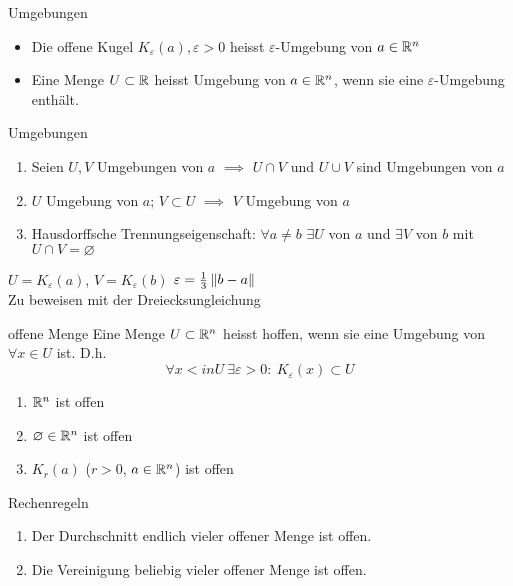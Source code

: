 \begin{Def}{Umgebungen}
  \begin{itemize}
    \item Die offene Kugel $K_\varepsilon(a), \varepsilon>0$ heisst $\varepsilon$-Umgebung von $a\in\mathbb{R}^n$
    \item Eine Menge $U\subset\mathbb{R}$ heisst Umgebung von $a\in\mathbb{R}^n$, wenn sie eine $\varepsilon$-Umgebung enthält.
  \end{itemize}
\end{Def}
\begin{Eig}{Umgebungen}
  \begin{enumerate}
    \item Seien $U,V$ Umgebungen von $a$ $\implies$ $U\cap V$ und $U\cup V$ sind Umgebungen von $a$
    \item $U$ Umgebung von $a$; $V \subset U$ $\implies$ $V$ Umgebung von $a$
    \item Hausdorffsche Trennungseigenschaft: $\forall a\neq b$ $\exists U$ von $a$ und $\exists V$ von $b$ mit $U\cap V=\varnothing$
  \end{enumerate}
\end{Eig}
\begin{Bsp}
  $U=K_\varepsilon(a)$, $V=K_\varepsilon(b)$ $\varepsilon=\frac{1}{3}\left\| b-a \right\|$\\
  Zu beweisen mit der Dreiecksungleichung
\end{Bsp}
\begin{Def}{offene Menge}
  Eine Menge $U\subset \mathbb{R}^n$ heisst hoffen, wenn sie eine Umgebung von $\forall x\in U$ ist. D.h.
  \[\forall x<in U\ \exists\varepsilon>0:\ K_\varepsilon(x) \subset U\]
\end{Def}
\begin{Bsp}
  \begin{enumerate}
    \item $\mathbb{R}^n$ ist offen
    \item $\varnothing\in\mathbb{R}^n$ ist offen
    \item $K_r(a)$ ($r>0$, $a\in \mathbb{R}^n$) ist offen
  \end{enumerate}
\end{Bsp}
\begin{Bem}{Rechenregeln}
  \begin{enumerate}
    \item Der Durchschnitt endlich vieler offener Menge ist offen.
    \item Die Vereinigung beliebig vieler offener Menge ist offen.
  \end{enumerate}
\end{Bem}
